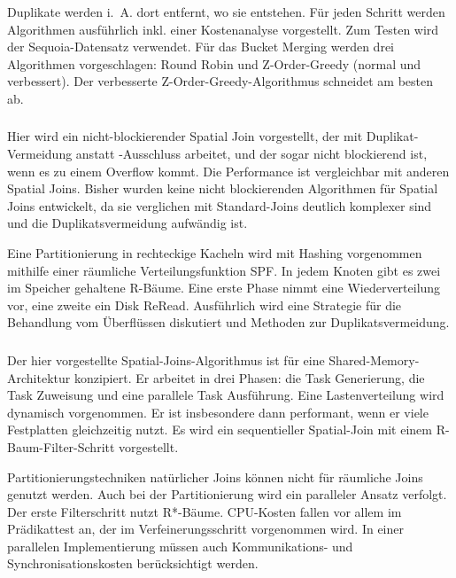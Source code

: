 \documentclass[a4paper,12pt,twoside]{article}
\begin{document}
Duplikate werden i.~A. dort entfernt, wo sie entstehen. Für jeden Schritt werden Algorithmen ausführlich inkl. einer Kostenanalyse vorgestellt. Zum Testen wird der Sequoia-Datensatz verwendet. Für das Bucket Merging werden drei Algorithmen vorgeschlagen: Round Robin und Z-Order-Greedy (normal und verbessert). Der verbesserte Z-Order-Greedy-Algorithmus schneidet am besten ab. 

\subsubsection*{}

Hier wird ein nicht-blockierender Spatial Join vorgestellt, der mit Duplikat-Vermeidung anstatt -Ausschluss arbeitet, und der sogar nicht blockierend ist, wenn es zu einem Overflow kommt. Die Performance ist vergleichbar mit anderen Spatial Joins. Bisher wurden keine nicht blockierenden Algorithmen für Spatial Joins entwickelt, da sie verglichen mit Standard-Joins deutlich komplexer sind und die Duplikatsvermeidung aufwändig ist.

Eine Partitionierung in rechteckige Kacheln wird mit Hashing vorgenommen mithilfe einer räumliche Verteilungsfunktion SPF. In jedem Knoten gibt es zwei im Speicher gehaltene R-Bäume. Eine erste Phase nimmt eine Wiederverteilung vor, eine zweite ein Disk ReRead. Ausführlich wird eine Strategie für die Behandlung vom Überflüssen diskutiert und Methoden zur Duplikatsvermeidung. 

\subsubsection*{}

Der hier vorgestellte Spatial-Joins-Algorithmus ist für eine Shared-Memory-Architektur konzipiert. Er arbeitet in drei Phasen: die Task Generierung, die Task Zuweisung und eine parallele Task Ausführung. Eine Lastenverteilung wird dynamisch vorgenommen. Er ist insbesondere dann performant, wenn er viele Festplatten gleichzeitig nutzt. Es wird ein sequentieller Spatial-Join mit einem R-Baum-Filter-Schritt vorgestellt.

Partitionierungstechniken natürlicher Joins können nicht für räumliche Joins genutzt werden. Auch bei der Partitionierung wird ein paralleler Ansatz verfolgt. Der erste Filterschritt nutzt R*-Bäume. CPU-Kosten fallen vor allem im Prädikattest an, der im Verfeinerungsschritt vorgenommen wird. In einer parallelen Implementierung müssen auch Kommunikations- und Synchronisationskosten berücksichtigt werden. 
\end{document}
